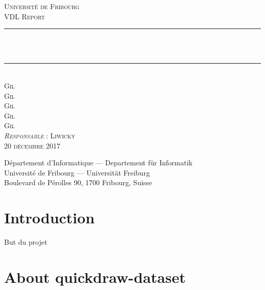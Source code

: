 \documentclass[
  10pt, 
  a4paper,
  oneside, 
  headinclude, 
  footinclude, 
  BCOR5mm, 
]{scrartcl}
\newcommand{\HRule}{\rule{\linewidth}{0.5mm}}
\begin{document}

\begin{titlepage}
  \begin{sffamily}
  \begin{center}
    \textsc{\LARGE Université de Fribourg} \\ [2cm]
    \textsc{\Large VDL Report} \\ [2cm]

    \HRule \\ [0.5cm]
    {\huge{} \\ [0.5cm]}
    \HRule \\ [2cm]
    
    \textsc{
    	\Large Gil  \\
    	\Large Gil  \\
    	\Large Gil  \\
    	\Large Gil  \\
    	\Large Gil } \\ [2cm]
    
    \textsc{\large \emph{Responsable} : Liwicky } \\ [0.5cm]
    \textsc{\Large 20 décembre 2017} \\    

    \vfill

    Département d’Informatique — Departement für Informatik \\
    Université de Fribourg — Universität Freiburg \\
    Boulevard de Pérolles 90, 1700 Fribourg, Suisse
  \end{center}
  \end{sffamily}
\end{titlepage}

\newpage


\section{Introduction}

But du projet


\section{About quickdraw-dataset}
\end{document}
